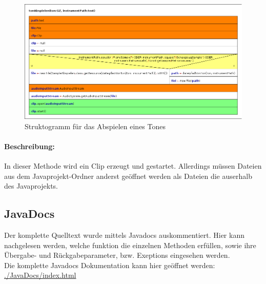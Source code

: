 \newpage

\begin{figure}[h]
 \centering
 \includegraphics[width=1\textwidth]{./Bilder/tonAbspielen.png}
 \caption{Struktogramm für das Abspielen eines Tones} \label{fig:tonAbspielen}
\end{figure}

\paragraph{Beschreibung:} In dieser Methode wird ein Clip erzeugt und gestartet. Allerdings müssen 
Dateien aus dem Javaprojekt-Ordner anderst geöffnet werden als Dateien die auserhalb des 
Javaprojekts.



\subsection{JavaDocs}
Der komplette Quelltext wurde mittels Javadocs auskommentiert. Hier kann nachgelesen werden, welche 
funktion die einzelnen Methoden erfüllen, sowie ihre Übergabe- und Rückgabeparameter, bzw. 
Exeptions  eingesehen werden.\\
Die komplette Javadocs Dokumentation kann hier geöffnet werden:\\
\url{./JavaDocs/index.html}



